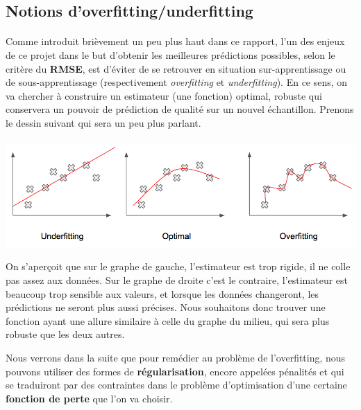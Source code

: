 \documentclass[14pt, openany]{article}
\begin{document}
\subsection{Notions d'overfitting/underfitting}
\paragraph{}
Comme introduit brièvement un peu plus haut dans ce rapport, l'un des enjeux de ce projet dans le but d'obtenir les meilleures prédictions possibles, selon le critère du \textbf{RMSE}, est d'éviter de se retrouver en situation sur-apprentissage ou de sous-apprentissage (respectivement \textit{overfitting} et \textit{underfitting}). En ce sens, on va chercher à construire un estimateur (une fonction) optimal, robuste qui conservera un pouvoir de prédiction de qualité sur un nouvel échantillon. Prenons le dessin suivant qui sera un peu plus parlant.
\paragraph{}
\includegraphics[width=17cm]{Images/overfitting.png}
\begin{center}
\label{fig1}
\end{center}
On s'aperçoit que sur le graphe de gauche, l'estimateur est trop rigide, il ne \og colle \fg{} pas assez aux données. Sur le graphe de droite c'est le contraire, l'estimateur est beaucoup trop sensible aux valeurs, et lorsque les données changeront, les prédictions ne seront plus aussi précises. Nous souhaitons donc trouver une fonction ayant une allure similaire à celle du graphe du milieu, qui sera plus \og robuste \fg{} que les deux autres.


Nous verrons dans la suite que pour remédier au problème de l'overfitting, nous pouvons utiliser des formes de \textbf{régularisation}, encore appelées pénalités et qui se traduiront par des contraintes dans le problème d'optimisation d'une certaine \textbf{fonction de perte} que l'on va choisir.\\
\end{document}
